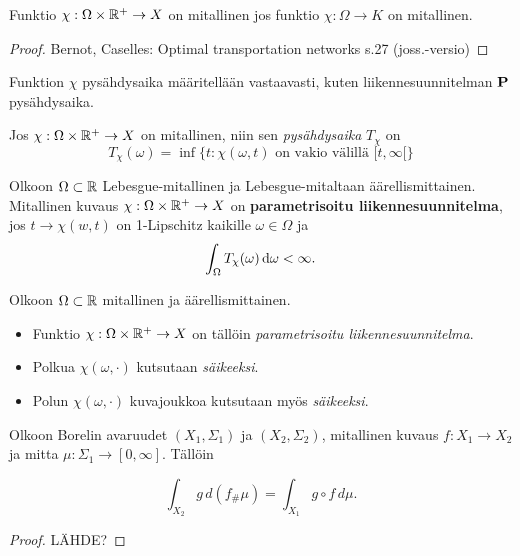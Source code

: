 \begin{theorem}
    Funktio $\chi: \Omega \times \R^+ \to X $ on mitallinen jos funktio $ \chi: \Omega \to K$ on mitallinen.
\end{theorem}
\begin{proof}
Bernot, Caselles: Optimal transportation networks s.27 (joss.-versio)
\end{proof}
Funktion $\chi$ pysähdysaika määritellään vastaavasti, kuten liikennesuunnitelman $\P$ pysähdysaika.
\begin{definition}
    Jos $\chi: \Omega \times \R^+ \to X$ on mitallinen, niin sen \textit{pysähdysaika} $T_\chi$ on
    \[T_\chi (\omega) = \inf\{t : \chi(\omega, t) \text{ on vakio välillä } [t,\infty[\}\]
\end{definition}

\begin{definition}
    Olkoon $\Omega \subset \R$ Lebesgue-mitallinen ja Lebesgue-mitaltaan äärellismittainen. Mitallinen kuvaus $\chi: \Omega \times \R^+ \to X$ on \textbf{parametrisoitu liikennesuunnitelma}, jos $t\to \chi(w,t)$ on 1-Lipschitz kaikille $\omega \in \Omega$ ja
    \[\int_\Omega T_\chi (\omega) \, \d \omega < \infty .\]
\end{definition}

\begin{definition}
    Olkoon $\Omega\subset \R$ mitallinen ja äärellismittainen. 
    \begin{itemize}
        \item Funktio $\chi:\Omega \times \R^+ \to X$ on tällöin \textit{parametrisoitu liikennesuunnitelma}. \item Polkua $\chi(\omega, \cdot)$ kutsutaan \textit{säikeeksi}.
        \item Polun $\chi(\omega, \cdot)$ kuvajoukkoa kutsutaan myös \textit{säikeeksi}.
    \end{itemize}
\end{definition}

\begin{theorem}\label{thm:push-cov}
    Olkoon Borelin avaruudet $(X_1, \Sigma_1)$ ja $(X_2, \Sigma_2)$, mitallinen kuvaus $f: X_1 \to X_2$ ja mitta $\mu:\Sigma_1 \to [0, \infty]$.  Tällöin
    
    \begin{equation*}
        \int_{X_2} g \, d(f_{\#} \mu) = \int_{X_1} g \circ f \, d\mu.
    \end{equation*}
\end{theorem}
\begin{proof}
LÄHDE?
\end{proof}

